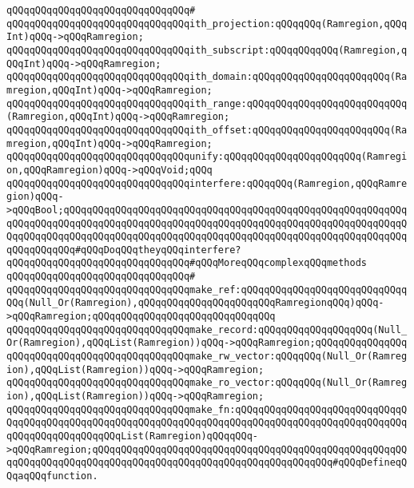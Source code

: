 \verb|qQQqqQQqqQQqqQQqqQQqqQQqqQQqqQQq#|\newline
\verb|qQQqqQQqqQQqqQQqqQQqqQQqqQQqqQQqith_projection:qQQqqQQq(Ramregion,qQQqInt)qQQq->qQQqRamregion;|\newline
\verb|qQQqqQQqqQQqqQQqqQQqqQQqqQQqqQQqith_subscript:qQQqqQQqqQQq(Ramregion,qQQqInt)qQQq->qQQqRamregion;|\newline
\verb|qQQqqQQqqQQqqQQqqQQqqQQqqQQqqQQqith_domain:qQQqqQQqqQQqqQQqqQQqqQQq(Ramregion,qQQqInt)qQQq->qQQqRamregion;|\newline
\verb|qQQqqQQqqQQqqQQqqQQqqQQqqQQqqQQqith_range:qQQqqQQqqQQqqQQqqQQqqQQqqQQq(Ramregion,qQQqInt)qQQq->qQQqRamregion;|\newline
\verb|qQQqqQQqqQQqqQQqqQQqqQQqqQQqqQQqith_offset:qQQqqQQqqQQqqQQqqQQqqQQq(Ramregion,qQQqInt)qQQq->qQQqRamregion;|\newline
\newline
\verb|qQQqqQQqqQQqqQQqqQQqqQQqqQQqqQQqunify:qQQqqQQqqQQqqQQqqQQqqQQq(Ramregion,qQQqRamregion)qQQq->qQQqVoid;qQQq|\newline
\verb|qQQqqQQqqQQqqQQqqQQqqQQqqQQqqQQqinterfere:qQQqqQQq(Ramregion,qQQqRamregion)qQQq->qQQqBool;qQQqqQQqqQQqqQQqqQQqqQQqqQQqqQQqqQQqqQQqqQQqqQQqqQQqqQQqqQQqqQQqqQQqqQQqqQQqqQQqqQQqqQQqqQQqqQQqqQQqqQQqqQQqqQQqqQQqqQQqqQQqqQQqqQQqqQQqqQQqqQQqqQQqqQQqqQQqqQQqqQQqqQQqqQQqqQQqqQQqqQQqqQQqqQQqqQQqqQQqqQQqqQQqqQQq#qQQqDoqQQqtheyqQQqinterfere?|\newline
\newline
\newline
\verb|qQQqqQQqqQQqqQQqqQQqqQQqqQQqqQQq#qQQqMoreqQQqcomplexqQQqmethods|\newline
\verb|qQQqqQQqqQQqqQQqqQQqqQQqqQQqqQQq#|\newline
\verb|qQQqqQQqqQQqqQQqqQQqqQQqqQQqqQQqmake_ref:qQQqqQQqqQQqqQQqqQQqqQQqqQQqqQQq(Null_Or(Ramregion),qQQqqQQqqQQqqQQqqQQqqQQqRamregionqQQq)qQQq->qQQqRamregion;qQQqqQQqqQQqqQQqqQQqqQQqqQQqqQQq|\newline
\verb|qQQqqQQqqQQqqQQqqQQqqQQqqQQqqQQqmake_record:qQQqqQQqqQQqqQQqqQQq(Null_Or(Ramregion),qQQqList(Ramregion))qQQq->qQQqRamregion;qQQqqQQqqQQqqQQq|\newline
\verb|qQQqqQQqqQQqqQQqqQQqqQQqqQQqqQQqmake_rw_vector:qQQqqQQq(Null_Or(Ramregion),qQQqList(Ramregion))qQQq->qQQqRamregion;|\newline
\verb|qQQqqQQqqQQqqQQqqQQqqQQqqQQqqQQqmake_ro_vector:qQQqqQQq(Null_Or(Ramregion),qQQqList(Ramregion))qQQq->qQQqRamregion;|\newline
\verb|qQQqqQQqqQQqqQQqqQQqqQQqqQQqqQQqmake_fn:qQQqqQQqqQQqqQQqqQQqqQQqqQQqqQQqqQQqqQQqqQQqqQQqqQQqqQQqqQQqqQQqqQQqqQQqqQQqqQQqqQQqqQQqqQQqqQQqqQQqqQQqqQQqqQQqqQQqqQQqList(Ramregion)qQQqqQQq->qQQqRamregion;qQQqqQQqqQQqqQQqqQQqqQQqqQQqqQQqqQQqqQQqqQQqqQQqqQQqqQQqqQQqqQQqqQQqqQQqqQQqqQQqqQQqqQQqqQQqqQQqqQQqqQQqqQQqqQQq#qQQqDefineqQQqaqQQqfunction.|\newline
